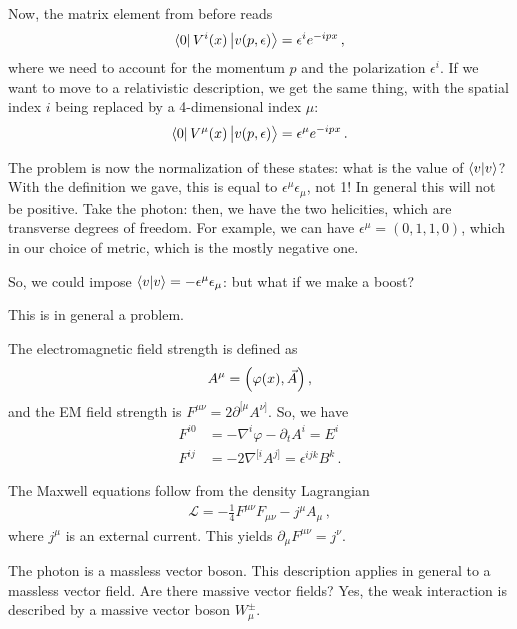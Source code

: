\documentclass[main.tex]{subfiles}
\begin{document}
Now, the matrix element from before reads 
%
\begin{align}
\bra{0} V^{i}(x) \ket{v(p, \epsilon )} = \epsilon^{i} e^{-ipx}
\,,
\end{align}
%
where we need to account for the momentum \(p\) and the polarization \(\epsilon^{i} \). 
If we want to move to a relativistic description, we get the same thing, with the spatial index \(i\) being replaced by a 4-dimensional index \(\mu \):
%
\begin{align}
\bra{0} V^{\mu }(x) \ket{v(p, \epsilon )} = \epsilon^{\mu } e^{-ipx}
\,.
\end{align}

The problem is now the normalization of these states: what is the value of \(\braket{v}{v}\)? 
With the definition we gave, this is equal to \(\epsilon^{\mu } \epsilon_{\mu }\), not 1! 
In general this will not be positive. Take the photon: then, we have the two helicities, which are transverse degrees of freedom. 
For example, we can have \(\epsilon ^{\mu } = (0,1,1,0)\), which in our choice of metric, which is the mostly negative one. 

So, we could impose \(\braket{v}{v} = - \epsilon^{\mu } \epsilon_{\mu }\): but what if we make a boost?

This is in general a problem. 

The electromagnetic field strength is defined as 
%
\begin{align}
A^{\mu }  = \qty(\varphi (x), \vec{A})
\,,
\end{align}
%
and the EM field strength is \(F^{\mu \nu } = 2 \partial^{[\mu } A^{\nu ]}\). So, we have 
%
\begin{subequations}
\begin{align}
F^{i0} &= - \nabla^{i} \varphi - \partial_{t} A^{i} = E^{i}  \\
 F^{ij} &=  - 2\nabla^{[i} A^{j]} = \epsilon^{ijk} B^{k}
\,.
\end{align}
\end{subequations}

The Maxwell equations follow from the density Lagrangian 
%
\begin{align}
\mathscr{L} = - \frac{1}{4} F^{\mu \nu } F_{\mu \nu } - j^{\mu } A_{\mu }
\,,
\end{align}
%
where \(j^{\mu }\) is an external current. This yields \(\partial_{\mu } F^{\mu \nu } = j^{\nu }\). 

The photon is a massless vector boson. This description applies in general to a massless vector field. 
Are there massive vector fields?
Yes, the weak interaction is described by a massive vector boson \(W^{\pm}_{\mu }\).
\end{document}
